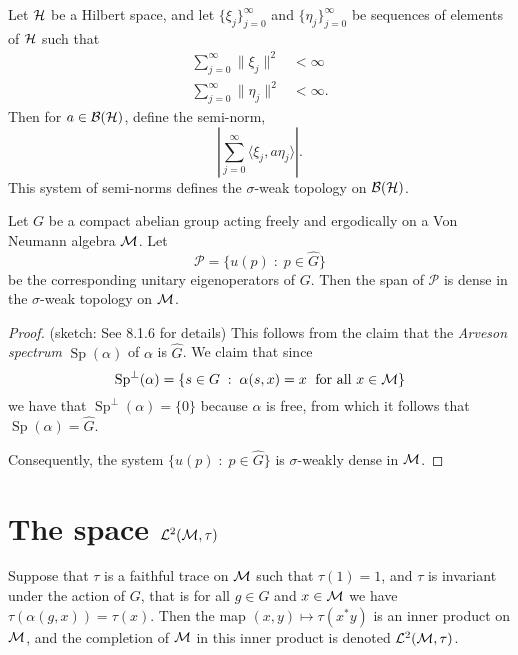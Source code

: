\begin{definition}
    Let $\mathcal{H}$ be a Hilbert space, and let $\{\xi_j\}_{j = 0}^\infty$
    and $\{\eta_j\}_{j=0}^\infty$ be sequences of elements of $\mathcal{H}$
    such that 
    \begin{align}
        \sum_{j=0}^\infty \|\xi_j\|^2 &< \infty\\
        \sum_{j=0}^\infty \|\eta_j\|^2 &< \infty.
    \end{align}
    Then for $a \in \mathcal{B}(\mathcal{H})$, define the semi-norm,
    \begin{equation}
        \left| \sum_{j=0}^\infty \langle \xi_j,a\eta_j\rangle\right|.
    \end{equation}
    This system of semi-norms defines the $\sigma$-weak topology
    on $\mathcal{B}(\mathcal{H})$.
\end{definition}



\begin{proposition}
    Let $G$ be a compact abelian group acting freely and ergodically 
    on a Von Neumann algebra $\mathcal{M}$. Let
    \begin{equation}
        \mathcal{P} = \{ u(p)\;:\; p \in \widehat{G}\}
    \end{equation}
    be the corresponding unitary eigenoperators of $G$. Then the span
    of $\mathcal{P}$ is dense in the $\sigma$-weak topology on $\mathcal{M}$.
\end{proposition}
\begin{proof}
    (sketch: See \cite{pedersen} 8.1.6 for details) This follows from the claim that the \emph{Arveson spectrum}
    $\operatorname{Sp}(\alpha)$
    of $\alpha$ is $\widehat{G}$. We claim that since
    \begin{equation}
        \operatorname{Sp}^{\perp}(\alpha) = \{ s \in G\;:\; \alpha(s,x) = x\;\text{ for all }x \in \mathcal{M}\}
    \end{equation} 
    we have that $\operatorname{Sp}^\perp(\alpha) = \{0\}$ because $\alpha$
    is free,
    from which it follows that $\operatorname{Sp}(\alpha) = \widehat{G}$.
    
    Consequently, the system $\{u(p)\;:\; p \in \widehat{G}\}$ is $\sigma$-weakly
    dense in $\mathcal{M}$.
\end{proof}

\section{The space $\mathcal{L}^2(\mathcal{M},\tau)$}
Suppose that $\tau$ is a faithful trace on $\mathcal{M}$ such that $\tau(1) = 1$,
and $\tau$ is invariant under the action of $G$, that is for
all $g \in G$ and $x \in \mathcal{M}$ we have $\tau(\alpha(g,x)) = \tau(x)$. 
Then the map $(x,y)\mapsto \tau(x^*y)$ is an inner product on $\mathcal{M}$,
and the completion of $\mathcal{M}$ in this inner product is denoted $\mathcal{L}^2(\mathcal{M},\tau)$.

